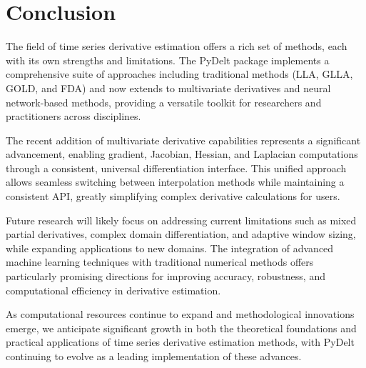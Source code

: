 \documentclass{article}
\begin{document}
\section{Conclusion}

The field of time series derivative estimation offers a rich set of methods, each with its own strengths and limitations. The PyDelt package implements a comprehensive suite of approaches including traditional methods (LLA, GLLA, GOLD, and FDA) and now extends to multivariate derivatives and neural network-based methods, providing a versatile toolkit for researchers and practitioners across disciplines.

The recent addition of multivariate derivative capabilities represents a significant advancement, enabling gradient, Jacobian, Hessian, and Laplacian computations through a consistent, universal differentiation interface. This unified approach allows seamless switching between interpolation methods while maintaining a consistent API, greatly simplifying complex derivative calculations for users.

Future research will likely focus on addressing current limitations such as mixed partial derivatives, complex domain differentiation, and adaptive window sizing, while expanding applications to new domains. The integration of advanced machine learning techniques with traditional numerical methods offers particularly promising directions for improving accuracy, robustness, and computational efficiency in derivative estimation.

As computational resources continue to expand and methodological innovations emerge, we anticipate significant growth in both the theoretical foundations and practical applications of time series derivative estimation methods, with PyDelt continuing to evolve as a leading implementation of these advances.
\end{document}
